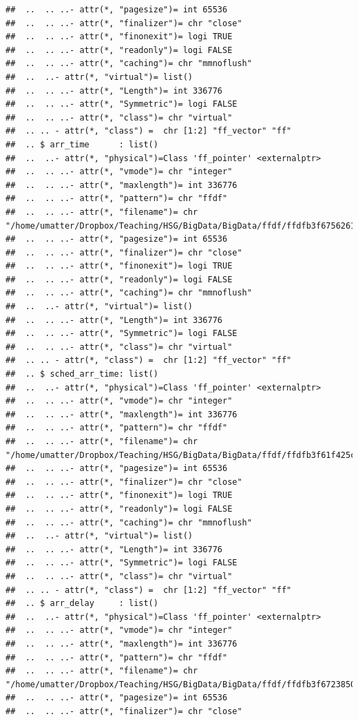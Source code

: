 \documentclass[
  12pt,
]{style/krantz}
\begin{document}
\begin{verbatim}
##  ..  .. ..- attr(*, "pagesize")= int 65536
##  ..  .. ..- attr(*, "finalizer")= chr "close"
##  ..  .. ..- attr(*, "finonexit")= logi TRUE
##  ..  .. ..- attr(*, "readonly")= logi FALSE
##  ..  .. ..- attr(*, "caching")= chr "mmnoflush"
##  ..  ..- attr(*, "virtual")= list()
##  ..  .. ..- attr(*, "Length")= int 336776
##  ..  .. ..- attr(*, "Symmetric")= logi FALSE
##  ..  .. ..- attr(*, "class")= chr "virtual"
##  .. .. - attr(*, "class") =  chr [1:2] "ff_vector" "ff"
##  .. $ arr_time      : list()
##  ..  ..- attr(*, "physical")=Class 'ff_pointer' <externalptr> 
##  ..  .. ..- attr(*, "vmode")= chr "integer"
##  ..  .. ..- attr(*, "maxlength")= int 336776
##  ..  .. ..- attr(*, "pattern")= chr "ffdf"
##  ..  .. ..- attr(*, "filename")= chr "/home/umatter/Dropbox/Teaching/HSG/BigData/BigData/ffdf/ffdfb3f67562615a.ff"
##  ..  .. ..- attr(*, "pagesize")= int 65536
##  ..  .. ..- attr(*, "finalizer")= chr "close"
##  ..  .. ..- attr(*, "finonexit")= logi TRUE
##  ..  .. ..- attr(*, "readonly")= logi FALSE
##  ..  .. ..- attr(*, "caching")= chr "mmnoflush"
##  ..  ..- attr(*, "virtual")= list()
##  ..  .. ..- attr(*, "Length")= int 336776
##  ..  .. ..- attr(*, "Symmetric")= logi FALSE
##  ..  .. ..- attr(*, "class")= chr "virtual"
##  .. .. - attr(*, "class") =  chr [1:2] "ff_vector" "ff"
##  .. $ sched_arr_time: list()
##  ..  ..- attr(*, "physical")=Class 'ff_pointer' <externalptr> 
##  ..  .. ..- attr(*, "vmode")= chr "integer"
##  ..  .. ..- attr(*, "maxlength")= int 336776
##  ..  .. ..- attr(*, "pattern")= chr "ffdf"
##  ..  .. ..- attr(*, "filename")= chr "/home/umatter/Dropbox/Teaching/HSG/BigData/BigData/ffdf/ffdfb3f61f425c93.ff"
##  ..  .. ..- attr(*, "pagesize")= int 65536
##  ..  .. ..- attr(*, "finalizer")= chr "close"
##  ..  .. ..- attr(*, "finonexit")= logi TRUE
##  ..  .. ..- attr(*, "readonly")= logi FALSE
##  ..  .. ..- attr(*, "caching")= chr "mmnoflush"
##  ..  ..- attr(*, "virtual")= list()
##  ..  .. ..- attr(*, "Length")= int 336776
##  ..  .. ..- attr(*, "Symmetric")= logi FALSE
##  ..  .. ..- attr(*, "class")= chr "virtual"
##  .. .. - attr(*, "class") =  chr [1:2] "ff_vector" "ff"
##  .. $ arr_delay     : list()
##  ..  ..- attr(*, "physical")=Class 'ff_pointer' <externalptr> 
##  ..  .. ..- attr(*, "vmode")= chr "integer"
##  ..  .. ..- attr(*, "maxlength")= int 336776
##  ..  .. ..- attr(*, "pattern")= chr "ffdf"
##  ..  .. ..- attr(*, "filename")= chr "/home/umatter/Dropbox/Teaching/HSG/BigData/BigData/ffdf/ffdfb3f6723850c1.ff"
##  ..  .. ..- attr(*, "pagesize")= int 65536
##  ..  .. ..- attr(*, "finalizer")= chr "close"

\end{verbatim}
\end{document}
